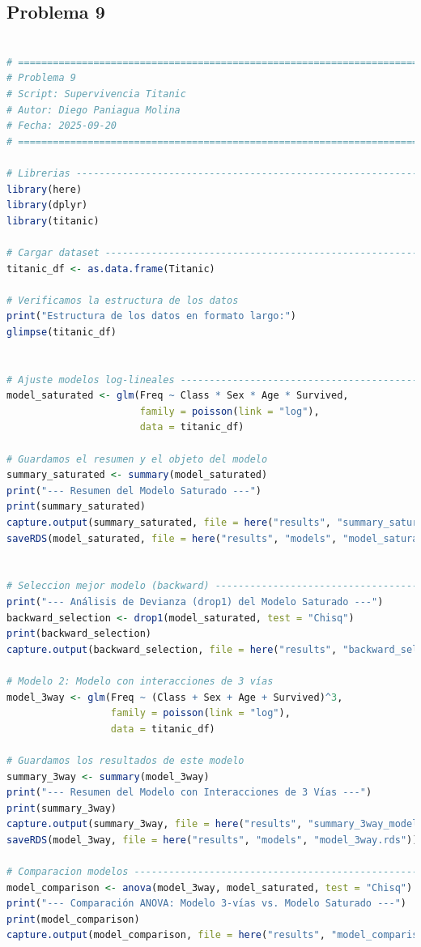 \clearpage

\subsection{Problema \textcolor{CIMATRed}{9}}

\begin{lstlisting}[language=R, caption={Script: Supervivencia Titanic.}, label={lst:script8}]

# =============================================================================
# Problema 9
# Script: Supervivencia Titanic
# Autor: Diego Paniagua Molina
# Fecha: 2025-09-20
# =============================================================================

# Librerias -------------------------------------------------------------------
library(here)
library(dplyr)
library(titanic)

# Cargar dataset --------------------------------------------------------------
titanic_df <- as.data.frame(Titanic)

# Verificamos la estructura de los datos
print("Estructura de los datos en formato largo:")
glimpse(titanic_df)


# Ajuste modelos log-lineales -------------------------------------------------
model_saturated <- glm(Freq ~ Class * Sex * Age * Survived,
                       family = poisson(link = "log"),
                       data = titanic_df)

# Guardamos el resumen y el objeto del modelo
summary_saturated <- summary(model_saturated)
print("--- Resumen del Modelo Saturado ---")
print(summary_saturated)
capture.output(summary_saturated, file = here("results", "summary_saturated_model.txt"))
saveRDS(model_saturated, file = here("results", "models", "model_saturated.rds"))


# Seleccion mejor modelo (backward) -------------------------------------------
print("--- Análisis de Devianza (drop1) del Modelo Saturado ---")
backward_selection <- drop1(model_saturated, test = "Chisq")
print(backward_selection)
capture.output(backward_selection, file = here("results", "backward_selection_analysis.txt"))

# Modelo 2: Modelo con interacciones de 3 vías 
model_3way <- glm(Freq ~ (Class + Sex + Age + Survived)^3,
                  family = poisson(link = "log"),
                  data = titanic_df)

# Guardamos los resultados de este modelo
summary_3way <- summary(model_3way)
print("--- Resumen del Modelo con Interacciones de 3 Vías ---")
print(summary_3way)
capture.output(summary_3way, file = here("results", "summary_3way_model.txt"))
saveRDS(model_3way, file = here("results", "models", "model_3way.rds"))

# Comparacion modelos ---------------------------------------------------------
model_comparison <- anova(model_3way, model_saturated, test = "Chisq")
print("--- Comparación ANOVA: Modelo 3-vías vs. Modelo Saturado ---")
print(model_comparison)
capture.output(model_comparison, file = here("results", "model_comparison_anova.txt"))

\end{lstlisting}


